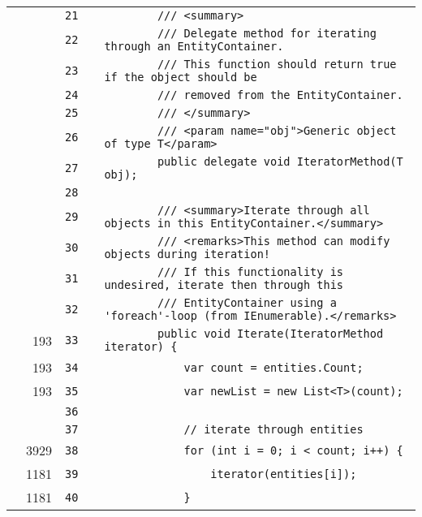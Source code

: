 \documentclass[a4paper,landscape,10pt]{article}
\begin{document}
\begin{longtable}[l]{lrrll}
\cellcolor{gray} &  & \verb~21~ & & \verb~        /// <summary>~\\
\cellcolor{gray} &  & \verb~22~ & & \verb~        /// Delegate method for iterating through an EntityContainer.~\\
\cellcolor{gray} &  & \verb~23~ & & \verb~        /// This function should return true if the object should be~\\
\cellcolor{gray} &  & \verb~24~ & & \verb~        /// removed from the EntityContainer.~\\
\cellcolor{gray} &  & \verb~25~ & & \verb~        /// </summary>~\\
\cellcolor{gray} &  & \verb~26~ & & \verb~        /// <param name="obj">Generic object of type T</param>~\\
\cellcolor{gray} &  & \verb~27~ & & \verb~        public delegate void IteratorMethod(T obj);~\\
\cellcolor{gray} &  & \verb~28~ & & \verb~~\\
\cellcolor{gray} &  & \verb~29~ & & \verb~        /// <summary>Iterate through all objects in this EntityContainer.</summary>~\\
\cellcolor{gray} &  & \verb~30~ & & \verb~        /// <remarks>This method can modify objects during iteration!~\\
\cellcolor{gray} &  & \verb~31~ & & \verb~        /// If this functionality is undesired, iterate then through this~\\
\cellcolor{gray} &  & \verb~32~ & & \verb~        /// EntityContainer using a 'foreach'-loop (from IEnumerable).</remarks>~\\
\cellcolor{green} & 193 & \verb~33~ & & \verb~        public void Iterate(IteratorMethod iterator) {~\\
\cellcolor{green} & 193 & \verb~34~ & & \verb~            var count = entities.Count;~\\
\cellcolor{green} & 193 & \verb~35~ & & \verb~            var newList = new List<T>(count);~\\
\cellcolor{gray} &  & \verb~36~ & & \verb~~\\
\cellcolor{gray} &  & \verb~37~ & & \verb~            // iterate through entities~\\
\cellcolor{green} & 3929 & \verb~38~ & & \verb~            for (int i = 0; i < count; i++) {~\\
\cellcolor{green} & 1181 & \verb~39~ & & \verb~                iterator(entities[i]);~\\
\cellcolor{green} & 1181 & \verb~40~ & & \verb~            }~\\

\end{longtable}
\end{document}
